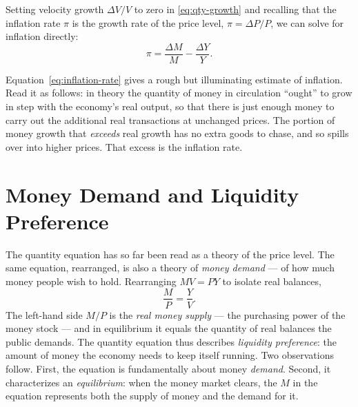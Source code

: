 
Setting velocity growth $\Delta V / V$ to zero in \eqref{eq:qty-growth} and recalling that the inflation rate $\pi$ is the growth rate of the price level, $\pi = \Delta P / P$, we can solve for inflation directly:
\begin{equation}
\pi = \frac{\Delta M}{M} - \frac{\Delta Y}{Y}.
\label{eq:inflation-rate}
\end{equation}


Equation~\eqref{eq:inflation-rate} gives a rough but illuminating estimate of inflation. Read it as follows: in theory the quantity of money in circulation ``ought'' to grow in step with the economy's real output, so that there is just enough money to carry out the additional real transactions at unchanged prices. The portion of money growth that \emph{exceeds} real growth has no extra goods to chase, and so spills over into higher prices. That excess is the inflation rate.

\section{Money Demand and Liquidity Preference}
\label{sec:money-demand}

The quantity equation has so far been read as a theory of the price level. The same equation, rearranged, is also a theory of \emph{money demand} --- of how much money people wish to hold. Rearranging $MV = PY$ to isolate real balances,
\begin{equation}
\frac{M}{P} = \frac{Y}{V}.
\label{eq:real-money}
\end{equation}
The left-hand side $M/P$ is the \emph{real money supply} --- the purchasing power of the money stock --- and in equilibrium it equals the quantity of real balances the public demands. The quantity equation thus describes \emph{liquidity preference}: the amount of money the economy needs to keep itself running. Two observations follow. First, the equation is fundamentally about money \emph{demand}. Second, it characterizes an \emph{equilibrium}: when the money market clears, the $M$ in the equation represents both the supply of money and the demand for it.

